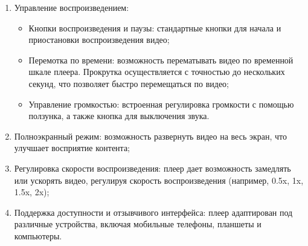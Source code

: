 	\begin{enumerate}[1.]
		\item Управление воспроизведением:
			\begin{itemize}[label=$\bullet$]
				\item Кнопки воспроизведения и паузы: стандартные кнопки для начала и приостановки воспроизведения видео;
				\item Перемотка по времени: возможность перематывать видео по временной шкале плеера. Прокрутка осуществляется с точностью до нескольких секунд, что позволяет быстро перемещаться по видео;
				\item Управление громкостью: встроенная регулировка громкости с помощью ползунка, а также кнопка для выключения звука.
			\end{itemize}
		\item Полноэкранный режим: возможность развернуть видео на весь экран, что улучшает восприятие контента;
		\item Регулировка скорости воспроизведения: плеер дает возможность замедлять или ускорять видео, регулируя скорость воспроизведения (например, 0.5x, 1x, 1.5x, 2x);
		\item Поддержка доступности и отзывчивого интерфейса: плеер адаптирован под различные устройства, включая мобильные телефоны, планшеты и компьютеры.
	\end{enumerate}
	
